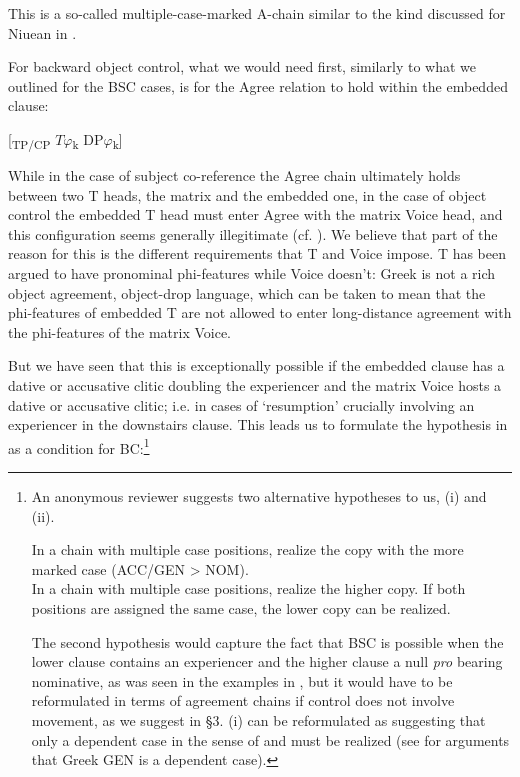 \documentclass[output=paper]{langsci/langscibook}
\begin{document}
This is a so-called multiple-case-marked A-chain similar to the kind discussed for Niuean in \citet[67]{Bejar1999}.

For backward object control, what we would need first, similarly to what we outlined for the BSC cases, is for the Agree relation to hold within the embedded clause:

\ea%
    \label{ex:alexiadou:54}
    \textsubscript{} [\textsubscript{TP/CP}    $T\varphi $\textsubscript{k}    DP$\varphi $\textsubscript{k}]  
\z
 
While in the case of subject co-reference the Agree chain ultimately holds between two T heads, the matrix and the embedded one, in the case of object control the embedded T head must enter Agree with the matrix Voice head, and this configuration seems generally illegitimate (cf. \citealt{Kayne1989}). We believe that part of the reason for this is the different requirements that T and Voice impose. T has been argued to have pronominal phi-features while Voice doesn’t: Greek is not a rich object agreement, object-drop language, which can be taken to mean that the phi-features of embedded T are not allowed to enter long-distance agreement with the phi-features of the matrix Voice. 

But we have seen that this is exceptionally possible if the embedded clause has a dative or accusative clitic doubling the experiencer and the matrix Voice hosts a dative or accusative clitic; i.e. in cases of ‘resumption’ crucially involving an experiencer in the downstairs clause. This leads us to formulate the hypothesis in  as a condition for BC:\footnote{An anonymous reviewer suggests two alternative hypotheses to us, (i) and (ii).

\ea \glt In a chain with multiple case positions, realize the copy with the more marked case (ACC\slash GEN > NOM).\\
\z
\ea \glt In a chain with multiple case positions, realize the higher copy. If both positions are assigned the same case, the lower copy can be realized.\\
\z    

The second hypothesis would capture the fact that BSC is possible when the lower clause contains an experiencer and the higher clause a null \textit{pro} bearing nominative, as was seen in the examples in , but it would have to be reformulated in terms of agreement chains if control does not involve movement, as we suggest in §3. (i) can be reformulated as suggesting that only a dependent case in the sense of \citet{Marantz1991} and \citet{Baker2015} must be realized (see \citealt{Anagnostopoulou2017} for arguments that Greek GEN is a dependent case).}
\end{document}
